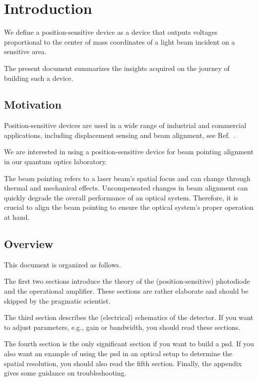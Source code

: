 \section{Introduction}

We define a position-sensitive device as a device that outputs voltages proportional to the center of mass coordinates of a light beam incident on a sensitive area.

The present document summarizes the insights acquired on the journey of building such a device.

\subsection{Motivation}

Position-sensitive devices are used in a wide range of industrial and commercial applications, including displacement sensing and beam alignment, see Ref.~\cite[p.~22]{Maekynen00}.

We are interested in using a position-sensitive device for beam pointing alignment in our quantum optics laboratory.

The beam pointing refers to a laser beam's spatial focus and can change through thermal and mechanical effects.
Uncompensated changes in beam alignment can quickly degrade the overall performance of an optical system.
Therefore, it is crucial to align the beam pointing to ensure the optical system's proper operation at hand.

\subsection{Overview}

This document is organized as follows.

The first two sections introduce the theory of the (position-sensitive) photodiode and the operational amplifier.
These sections are rather elaborate and should be skipped by the pragmatic scientist.

The third section describes the (electrical) schematics of the detector.
If you want to adjust parameters, e.g., gain or bandwidth, you should read these sections.

The fourth section is the only significant section if you want to build a \gls{psd}.
If you also want an example of using the \gls{psd} in an optical setup to determine the spatial resolution, you should also read the fifth section.
Finally, the appendix gives some guidance on troubleshooting.

